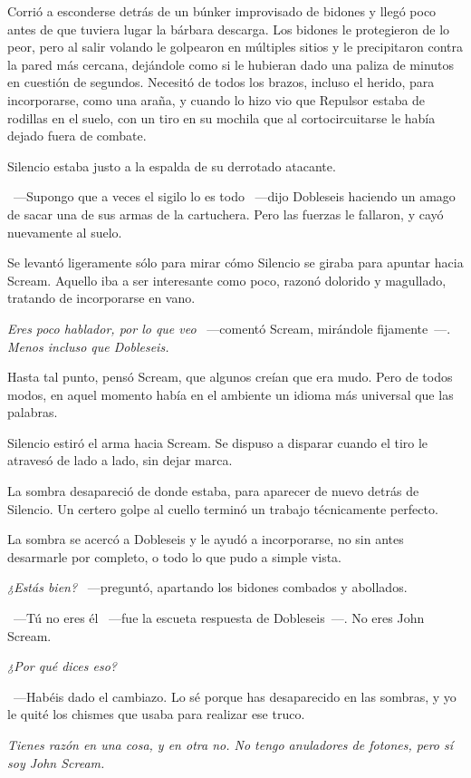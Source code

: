 Corrió a esconderse detrás de un búnker improvisado de bidones y llegó poco antes de que tuviera lugar la bárbara descarga. Los bidones le protegieron de lo peor, pero al salir volando le golpearon en múltiples sitios y le precipitaron contra la pared más cercana, dejándole como si le hubieran dado una paliza de minutos en cuestión de segundos. Necesitó de todos los brazos, incluso el herido, para incorporarse, como una araña, y cuando lo hizo vio que Repulsor estaba de rodillas en el suelo, con un tiro en su mochila que al cortocircuitarse le había dejado fuera de combate.

Silencio estaba justo a la espalda de su derrotado atacante.

~---Supongo que a veces el sigilo lo es todo ~---dijo Dobleseis haciendo un amago de sacar una de sus armas de la cartuchera. Pero las fuerzas le fallaron, y cayó nuevamente al suelo.

Se levantó ligeramente sólo para mirar cómo Silencio se giraba para apuntar hacia Scream. Aquello iba a ser interesante como poco, razonó dolorido y magullado, tratando de incorporarse en vano.

\emph{Eres poco hablador, por lo que veo} ~---comentó Scream, mirándole fijamente~---. \emph{Menos incluso que Dobleseis.}

Hasta tal punto, pensó Scream, que algunos creían que era mudo. Pero de todos modos, en aquel momento había en el ambiente un idioma más universal que las palabras.

Silencio estiró el arma hacia Scream. Se dispuso a disparar cuando el tiro le atravesó de lado a lado, sin dejar marca.

La sombra desapareció de donde estaba, para aparecer de nuevo detrás de Silencio. Un certero golpe al cuello terminó un trabajo técnicamente perfecto.

La sombra se acercó a Dobleseis y le ayudó a incorporarse, no sin antes desarmarle por completo, o todo lo que pudo a simple vista.

\emph{¿Estás bien?} ~---preguntó, apartando los bidones combados y abollados.

~---Tú no eres él ~---fue la escueta respuesta de Dobleseis~---. No eres John Scream.

\emph{¿Por qué dices eso?}

~---Habéis dado el cambiazo. Lo sé porque has desaparecido en las sombras, y yo le quité los chismes que usaba para realizar ese truco.

\emph{Tienes razón en una cosa, y en otra no. No tengo anuladores de fotones, pero sí soy John Scream.}


